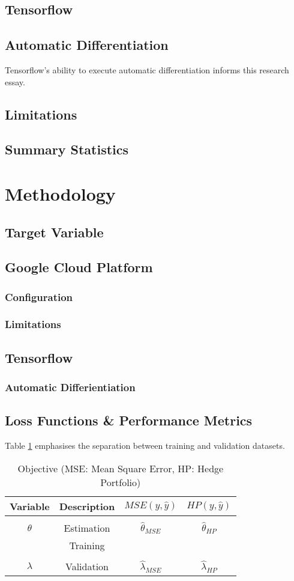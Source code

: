 \documentclass[12pt]{article}
\begin{document}
\subsection{Tensorflow}
\subsection{Automatic Differentiation}
Tensorflow's ability to execute automatic differentiation informs this research essay.
\subsection{Limitations}
\subsection{Summary Statistics}
\section{Methodology}
\subsection{Target Variable}
\subsection{Google Cloud Platform}
\subsubsection{Configuration}
\subsubsection{Limitations}
\subsection{Tensorflow}
\subsubsection{Automatic Differientiation}
\subsection{Loss Functions \& Performance Metrics}
Table \ref{hpt} emphasises the separation between training and validation datasets.
	\begin{table}[H]
		\centering
		\begin{tabular}{||c|c|c|c||}
			\hline
			Variable & Description & $ MSE(y,\hat{y}) $ & $ HP(y,\hat{y}) $\\ [0.5ex]
			\hline
			&&&\\
			$\theta$ & Estimation& $ \hat{\theta}_{MSE}$& $ \hat{\theta}_{HP}$ \\ [0.5ex]
			& Training & & \\
			\hline
			&&&\\
			$\lambda$ & Validation & $\hat{\lambda}_{MSE}$ & $\hat{\lambda}_{HP}$\\ [1.0ex]
			\hline
		\end{tabular}
	\caption{Objective (MSE: Mean Square Error, HP: Hedge Portfolio)}
	\label{hpt}
\end{table}
\end{document}
